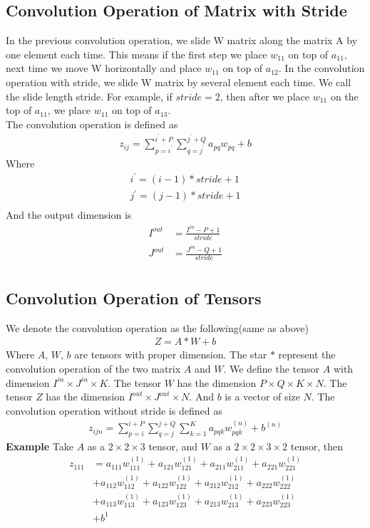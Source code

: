 \documentclass[a4paper]{article}
\begin{document}
\subsection{Convolution Operation of Matrix with Stride}
In the previous convolution operation, we slide W matrix along the matrix A by one element each time. This means if the first step we place $w_{11}$ on top of $a_{11}$, next time we move W horizontally and place $w_{11}$ on top of $a_{12}$. In the convolution operation with stride, we slide W matrix by several element each time. We call the slide length stride. For example, if $stride = 2$, then after we place $w_{11}$ on the top of $a_{11}$, we place $w_{11}$ on top of $a_{13}$.\\  
The convolution operation is defined as 
\begin{align*}
	z_{ij} = \sum_{p=i^{'}}^{i^{'}+P} \sum_{q=j^{'}}^{j^{'}+Q}  a_{pq} w_{pq} + b
\end{align*}
Where 
\begin{align*}
	i^{'} = (i-1)*stride +1\\
	j^{'} = (j-1)*stride +1\\
\end{align*}
And the output dimension is
\begin{align*}
	I^{out} & = \frac{I^{in} - P + 1}{stride} \\
	J^{out} & = \frac{J^{in} - Q + 1}{stride} \\
\end{align*}
\subsection{Convolution Operation of Tensors}
We denote the convolution operation as the following(same as above)
\begin{align*}
	Z= A*W +b
\end{align*}
Where $A$, $W$, $b$ are tensors with proper dimension. The star $*$ represent the convolution operation of the two matrix $A$ and $W$. We define the tensor $A$ with dimension $I^{in} \times J^{in} \times K$. The tensor $W$ has the dimension $P \times Q \times K \times N$. The tensor $Z$ has the dimension $I^{out} \times J^{out} \times N$. And $b$ is a vector of size $N$. The convolution operation without stride is defined as 
\begin{align*}
	z_{ijn} = \sum_{p=i}^{i+P} \sum_{q=j}^{j+Q} \sum_{k=1}^{K} a_{pqk} w_{pqk}^{(n)} + b^{(n)}
\end{align*}
{\bf Example}
Take $A$ as a $2 \times 2 \times 3$ tensor, and $W$ as a $2 \times 2 \times 3 \times 2$ tensor, then 
\begin{align*}
z_{111} & = a_{111} w_{111}^{(1)} + a_{121} w_{121}^{(1)} + a_{211} w_{211}^{(1)} + a_{221} w_{221}^{(1)}\\
		& + a_{112} w_{112}^{(1)} + a_{122} w_{122}^{(1)} + a_{212} w_{212}^{(1)} + a_{222} w_{222}^{(1)}\\	
		& + a_{113} w_{113}^{(1)} + a_{123} w_{123}^{(1)} + a_{213} w_{213}^{(1)} + a_{223} w_{223}^{(1)}\\	
		& + b^{1}\\
\end{align*}
\end{document}
